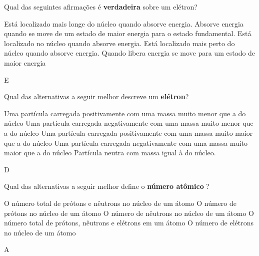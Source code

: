\documentclass[11pt]{article}
\begin{document}
\begin{exercise}
Qual das seguintes afirmações é \textbf{verdadeira} sobre um elétron?

\begin{choice}
\choice Está localizado mais longe do núcleo quando absorve energia.
\choice Absorve energia quando se move de um estado de maior energia para o estado fundamental.
\choice Está localizado no núcleo quando absorve energia.
\choice Está localizado mais perto do núcleo quando absorve energia.
\choice Quando libera energia se move para um estado de maior energia
\end{choice}
\end{exercise}
\begin{solution}
E
\end{solution}




\begin{exercise}
Qual das alternativas a seguir melhor descreve um \textbf{elétron}?
\begin{choice}
\choice Uma partícula carregada positivamente com uma massa muito menor que a do núcleo
\choice Uma partícula carregada negativamente com uma massa muito menor que a do núcleo
\choice Uma partícula carregada positivamente com uma massa muito maior que a do núcleo
\choice Uma partícula carregada negativamente com uma massa muito maior que a do núcleo
\choice Partícula neutra com massa igual à do núcleo.
\end{choice}
\end{exercise}
\begin{solution}
D
\end{solution}




\begin{exercise}
Qual das alternativas a seguir melhor define o \textbf{número atômico} ?

\begin{choice}
\choice O número total de prótons e nêutrons no núcleo de um átomo
\choice O número de prótons no núcleo de um átomo
\choice O número de nêutrons no núcleo de um átomo
\choice O número total de prótons, nêutrons e elétrons em um átomo
\choice O número de elétrons no núcleo de um átomo
\end{choice}
\end{exercise}
\begin{solution}
A
\end{solution}
\end{document}
